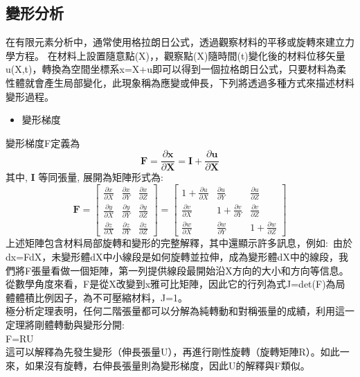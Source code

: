 \subsection{變形分析}

在有限元素分析中，通常使用格拉朗日公式，透過觀察材料的平移或旋轉來建立力學方程。
在材料上設置隨意點(X)，，觀察點(X)隨時間(t)變化後的材料位移矢量u(X,t)，轉換為空間坐標系x=X+u即可以得到一個拉格朗日公式，只要材料為柔性體就會產生局部變化，此現象稱為應變或伸長，下列將透過多種方式來描述材料變形過程。\

\begin{itemize}
\item 變形梯度
\end{itemize}

變形梯度F定義為
$$
\mathbf{F}=\frac{\partial \mathbf{x}}{\partial \mathbf{X}}=\mathbf{I}+\frac{\partial \mathbf{u}}{\partial \mathbf{X}}
$$
其中, $\mathbf{I}$ 等同張量, 展開為矩陣形式為:\
$$
\mathbf{F}=\left[\begin{array}{lll}
\frac{\partial x}{\partial X} & \frac{\partial x}{\partial Y} & \frac{\partial x}{\partial Z} \\
\frac{\partial y}{\partial X} & \frac{\partial y}{\partial Y} & \frac{\partial y}{\partial Z} \\
\frac{\partial z}{\partial X} & \frac{\partial z}{\partial Y} & \frac{\partial z}{\partial Z}
\end{array}\right]=\left[\begin{array}{ccc}
1+\frac{\partial u}{\partial X} & \frac{\partial u}{\partial Y} & \frac{\partial u}{\partial Z} \\
\frac{\partial v}{\partial X} & 1+\frac{\partial v}{\partial Y} & \frac{\partial v}{\partial Z} \\
\frac{\partial w}{\partial X} & \frac{\partial w}{\partial Y} & 1+\frac{\partial w}{\partial Z}
\end{array}\right]
$$
上述矩陣包含材料局部旋轉和變形的完整解釋，其中還顯示許多訊息，例如:\
由於dx=FdX，未變形體dX中小線段是如何旋轉並拉伸，成為變形體dX中的線段，我們將F張量看做一個矩陣，第一列提供線段最開始沿X方向的大小和方向等信息。從數學角度來看，F是從X改變到x雅可比矩陣，因此它的行列為式J=det(F)為局體體積比例因子，為不可壓縮材料，J=1。\\
極分析定理表明，任何二階張量都可以分解為純轉動和對稱張量的成績，利用這一定理將剛體轉動與變形分開:\\
F=RU\\
這可以解釋為先發生變形（伸長張量U），再進行剛性旋轉（旋轉矩陣R）。如此一來，如果沒有旋轉，右伸長張量則為變形梯度，因此U的解釋與F類似。\\
